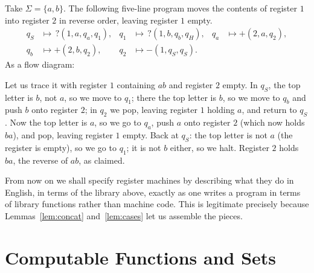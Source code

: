 \documentclass[a4paper]{scrartcl}
\newcommand{\initarr}[2]{\draw[tra] ($(#1)+#2$) -- (#1);}
\begin{document}
\begin{example}\label{ex:rmflow}
	Take $\Sigma = \{a,b\}$. The following five-line program moves the contents of register $1$ into register $2$ in reverse order, leaving register $1$ empty.
	\begin{align*}
		q_S &\mapsto\, ?(1,a,q_a,q_1), & q_1 &\mapsto\, ?(1,b,q_b,q_H), & q_a &\mapsto +(2,a,q_2), \\
		q_b &\mapsto +(2,b,q_2), & q_2 &\mapsto -(1,q_S,q_S). &&
	\end{align*}
	As a flow diagram:
	\begin{center}
	\end{center}
	Let us trace it with register $1$ containing $ab$ and register $2$ empty. In $q_S$, the top letter is $b$, not $a$, so we move to $q_1$; there the top letter is $b$, so we move to $q_b$ and push $b$ onto register $2$; in $q_2$ we pop, leaving register $1$ holding $a$, and return to $q_S$. Now the top letter is $a$, so we go to $q_a$, push $a$ onto register $2$ (which now holds $ba$), and pop, leaving register $1$ empty. Back at $q_S$: the top letter is not $a$ (the register is empty), so we go to $q_1$; it is not $b$ either, so we halt. Register $2$ holds $ba$, the reverse of $ab$, as claimed.
\end{example}

From now on we shall specify register machines by describing what they do in English, in terms of the library above, exactly as one writes a program in terms of library functions rather than machine code. This is legitimate precisely because Lemmas~\ref{lem:concat} and~\ref{lem:cases} let us assemble the pieces.

\section{Computable Functions and Sets}\label{sec:computable}
\end{document}

